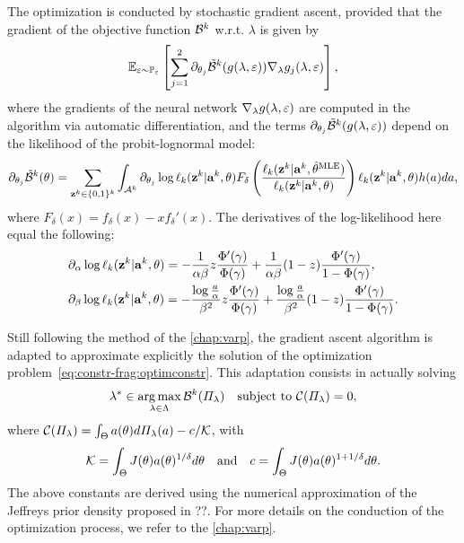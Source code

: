 The optimization is conducted by stochastic gradient ascent, provided that the gradient of the objective function $\mathcal{B}^k$ w.r.t. $\lambda$ is given by
    \begin{equation}
        \mathbb{E}_{\varepsilon\sim\mathbb{P}_\varepsilon}\left[\sum_{j=1}^{2}\partial_{\theta_j}\tilde{\mathcal{B}}^k(g(\lambda,\varepsilon))\nabla_\lambda g_j(\lambda,\varepsilon)
        \right],
    \end{equation}
where the gradients of the neural network $\nabla_\lambda g(\lambda,\varepsilon)$ are computed in the algorithm via automatic differentiation, and the terms $\partial_{\theta_j}\tilde{\mathcal{B}}^k(g(\lambda,\varepsilon))$  depend on the likelihood of %
the probit-lognormal model:
    \begin{equation}
        \partial_{\theta_j}\tilde{\mathcal{B}}^k(\theta) = \sum_{\mathbf{z}^k\in\{0,1\}^k}\int_{\mathcal{A}^k} \partial_{\theta_j}\log\ell_k(\mathbf{z}^k|\mathbf{a}^k,\theta) F_\delta\left(\frac{\ell_k(\mathbf{z}^k|\mathbf{a}^k,\hat\theta^{\text{MLE}})}{\ell_k(\mathbf{z}^k|\mathbf{a}^k,\theta)}\right)\ell_k(\mathbf{z}^k|\mathbf{a}^k,\theta)h(a)da,
    \end{equation}
where $F_\delta(x) = f_\delta(x)-xf_\delta'(x)$.
The derivatives of the log-likelihood here equal the following:
    \begin{equation}
        \begin{aligned}
            &\partial_\alpha\log\ell_k(\mathbf{z}^k|\mathbf{a}^k,\theta) =  -\frac{1}{\alpha\beta}z\frac{\Phi'(\gamma)}{\Phi(\gamma)} + \frac{1}{\alpha\beta}(1-z)\frac{\Phi'(\gamma)}{1-\Phi(\gamma)} , \\
            &\partial_\beta\log\ell_k(\mathbf{z}^k|\mathbf{a}^k,\theta) = -\frac{\log\frac{a}{\alpha}}{\beta^2}z\frac{\Phi'(\gamma)}{\Phi(\gamma)}+ \frac{\log\frac{a}{\alpha}}{\beta^2}(1-z)\frac{\Phi'(\gamma)}{1-\Phi(\gamma)} .
        \end{aligned}
    \end{equation}




Still following the method of the \cref{chap:varp},
the gradient ascent algorithm is adapted to approximate explicitly the solution of the optimization problem~\eqref{eq:constr-frag:optimconstr}.
This adaptation consists in actually solving
    \begin{equation}
        \lambda^\ast\in\operatorname*{arg\,max}_{\lambda\in\Lambda}\mathcal{B}^k(\varPi_\lambda)\quad\text{subject to\ } \mathcal{C}(\varPi_\lambda)=0,
    \end{equation}
where $\mathcal{C}(\varPi_\lambda)=\int_\Theta a(\theta)d\varPi_\lambda(a) - c/\mathcal{K}$, with
    \begin{equation}
        \mathcal{K}=\int_\Theta J(\theta)a(\theta)^{1/\delta}d\theta \quad\text{and}\quad
        c = \int_\Theta J(\theta)a(\theta)^{1+1/\delta}d\theta.
    \end{equation}
The above constants are derived using the numerical approximation of the Jeffreys prior density proposed in ??.
For more details on the conduction of the optimization process, we refer to the \cref{chap:varp}.



